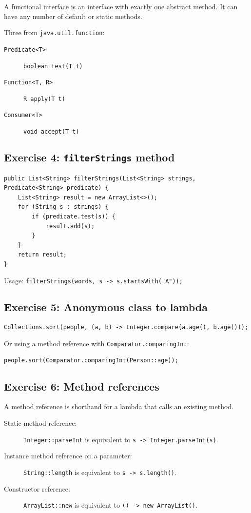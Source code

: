 \documentclass[twoside=false,DIV=14]{scrartcl}
\begin{document}
A functional interface is an interface with exactly one abstract method.  It can have any number of default or static methods.

Three from \texttt{java.util.function}:
\begin{description}
\item[\texttt{Predicate<T>}] \texttt{boolean test(T t)}
\item[\texttt{Function<T, R>}] \texttt{R apply(T t)}
\item[\texttt{Consumer<T>}] \texttt{void accept(T t)}
\end{description}

\subsection*{Exercise 4: \texttt{filterStrings} method}

\begin{lstlisting}
public List<String> filterStrings(List<String> strings, Predicate<String> predicate) {
    List<String> result = new ArrayList<>();
    for (String s : strings) {
        if (predicate.test(s)) {
            result.add(s);
        }
    }
    return result;
}
\end{lstlisting}

Usage: \texttt{filterStrings(words, s -> s.startsWith("A"));}

\subsection*{Exercise 5: Anonymous class to lambda}

\begin{lstlisting}
Collections.sort(people, (a, b) -> Integer.compare(a.age(), b.age()));
\end{lstlisting}

Or using a method reference with \texttt{Comparator.comparingInt}:
\begin{lstlisting}
people.sort(Comparator.comparingInt(Person::age));
\end{lstlisting}

\subsection*{Exercise 6: Method references}

A method reference is shorthand for a lambda that calls an existing method.

\begin{description}
\item[Static method reference:] \texttt{Integer::parseInt} is equivalent to \texttt{s -> Integer.parseInt(s)}.
\item[Instance method reference on a parameter:] \texttt{String::length} is equivalent to \texttt{s -> s.length()}.
\item[Constructor reference:] \texttt{ArrayList::new} is equivalent to \texttt{() -> new ArrayList()}.
\end{description}
\end{document}
